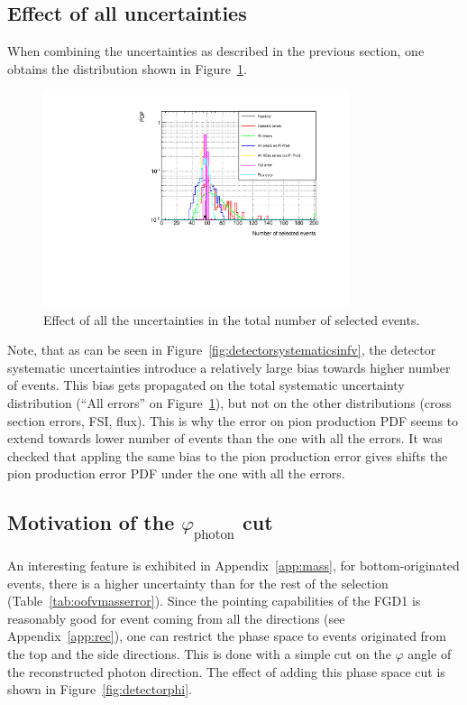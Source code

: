 \subsection{Effect of all uncertainties}
When combining the uncertainties as described in the previous section,
one obtains the distribution shown in Figure~\ref{fig:allsyst}.

\begin{figure}[ht]
  \begin{adjustbox}{center}
    \includegraphics[width=0.8\textwidth]{images/NCg/All.pdf}
  \end{adjustbox}
  \caption{Effect of all the uncertainties in the total number of
    selected events.}
  \label{fig:allsyst}
\end{figure}

Note, that as can be seen in Figure~\ref{fig:detectorsystematicsinfv},
the detector systematic uncertainties introduce a relatively large
bias towards higher number of events. This bias gets propagated on the
total systematic uncertainty distribution (``All errors'' on
Figure~\ref{fig:allsyst}), but not on the other distributions (cross
section errors, \Gls{FSI}, flux). This is why the error on pion
production \Gls{PDF} seems to extend towards lower number of events
than the one with all the errors. It was checked that appling the same
bias to the pion production error gives shifts the pion production
error \Gls{PDF} under the one with all the errors.

\subsection{\texorpdfstring{Motivation of the $\varphi_\text{photon}$ cut}%
  {Motivation of the photon phi cut}}
\label{subsec:downwardphotons}

An interesting feature is exhibited in Appendix~\ref{app:mass}, for
bottom-originated events, there is a higher uncertainty than for the
rest of the selection (Table~\ref{tab:oofvmasserror}). Since the
pointing capabilities of the \Gls{FGD}1 is reasonably good for event
coming from all the directions (see Appendix~\ref{app:rec}), one can
restrict the phase space to events originated from the top and the
side directions. This is done with a simple cut on the $\varphi$ angle
of the reconstructed photon direction.  The effect of adding this
phase space cut is shown in Figure~\ref{fig:detectorphi}.

